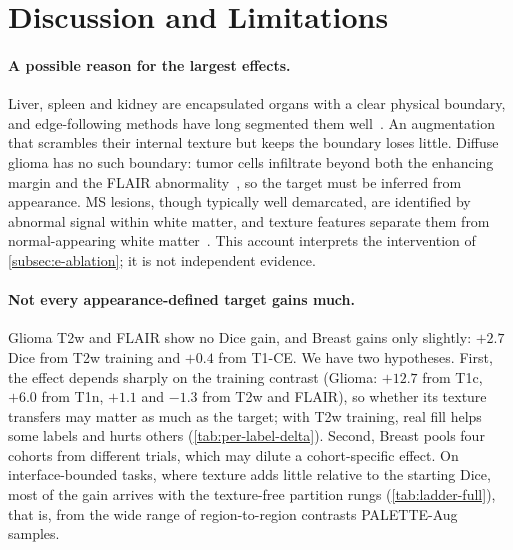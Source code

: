 \section{Discussion and Limitations}
\label{sec:discussion}

\paragraph{A possible reason for the largest effects.} Liver, spleen and kidney are
encapsulated organs with a clear physical boundary, and edge-following methods
have long segmented them well~\cite{lee2007gaclivers}. An
augmentation that scrambles their internal texture but keeps the boundary loses
little. Diffuse glioma has no such boundary: tumor cells infiltrate beyond both
the enhancing margin and the FLAIR abnormality~\cite{gliomamargins2025,flairectomy2022},
so the target must be inferred from appearance. MS lesions, though typically
well demarcated, are identified by abnormal signal within white matter, and
texture features separate them from normal-appearing white
matter~\cite{zhang2008mstexture}. This account interprets the intervention of
\cref{subsec:e-ablation}; it is not independent evidence.

\paragraph{Not every appearance-defined target gains much.} Glioma T2w and
FLAIR show no Dice gain, and Breast gains only slightly:
$+2.7$ Dice from T2w training and $+0.4$ from T1-CE. We have two hypotheses. First, the effect depends sharply on the
training contrast (Glioma: $+12.7$ from T1c, $+6.0$ from T1n, $+1.1$ and
$-1.3$ from T2w and FLAIR), so whether its texture transfers may matter as much as the
target; with T2w training, real fill helps some labels and hurts others
(\cref{tab:per-label-delta}). Second, Breast pools four cohorts from different
trials, which may dilute a cohort-specific effect. On interface-bounded
tasks, where texture adds little relative to the starting Dice, most of the
gain arrives with the texture-free partition rungs (\cref{tab:ladder-full}),
that is, from the wide range of region-to-region contrasts PALETTE-Aug
samples.


